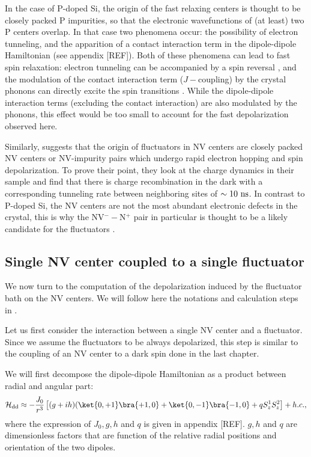 \documentclass[a4paper,11pt]{report}
\begin{document}
In the case of P-doped Si, the origin of the fast relaxing centers is thought to be closely packed P impurities, so that the electronic wavefunctions of (at least) two P centers overlap. In that case two phenomena occur: the possibility of electron tunneling, and the apparition of a contact interaction term in the dipole-dipole Hamiltonian (see appendix [REF]). Both of these phenomena can lead to fast spin relaxation: electron tunneling can be accompanied by a spin reversal \citep{sugihara1963spin}, and the modulation of the contact interaction term ($J-$coupling) by the crystal phonons can directly excite the spin transitions \citep{honig1960electron}. While the dipole-dipole interaction terms (excluding the contact interaction) are also modulated by the phonons, this effect would be too small to account for the fast depolarization observed here.

Similarly, \citep{choi2017depolarization} suggests that the origin of fluctuators in NV centers are closely packed NV centers or NV-impurity pairs which undergo rapid electron hopping and spin depolarization. To prove their point, they look at the charge dynamics in their sample and find that there is charge recombination in the dark with a corresponding tunneling rate between neighboring sites of $\sim 10\ \rm ns$. In contrast to P-doped Si, the NV centers are not the most abundant electronic defects in the crystal, this is why the NV$^--$N$^+$ pair in particular is thought to be a likely candidate for the fluctuators \citep{manson2018nv}.

\subsection{Single NV center coupled to a single fluctuator}
We now turn to the computation of the depolarization induced by the fluctuator bath on the NV centers. We will follow here the notations and calculation steps in \citep{choi2017depolarization}. 

Let us first consider the interaction between a single NV center and a fluctuator. Since we assume the fluctuators to be always depolarized, this step is similar to the coupling of an NV center to a dark spin done in the last chapter.

We will first decompose the dipole-dipole Hamiltonian as a product between radial and angular part:
\begin{equation}
\mathcal{H}_{\rm dd} \approx - \frac{J_0}{r^3} \left[(g+ih)(\ket{0,+1}\bra{+1,0}+\ket{0,-1}\bra{-1,0}+qS_z^1 S_z^2 \right] + h.c. ,
\end{equation}
where the expression of $J_0, g, h$ and $q$ is given in appendix [REF]. $g, h$ and $q$ are dimensionless factors that are function of the relative radial positions and orientation of the two dipoles.
\end{document}
